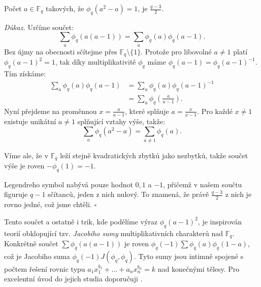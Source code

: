 \documentclass[12pt]{report}
\begin{document}


\begin{veta}
Počet $a \in \mathbb{F}_q$ takových, že $\phi_q ( a^2-a) = 1$, je $\frac{q-3}{2}$.
\end{veta}
\noindent \textit{Důkaz.} Určíme součet:
$$\sum_{a} \phi_q (a (a-1)) = \sum_{a} \phi_q (a) \phi_q (a-1).$$
Bez újmy na obecnosti sčítejme přes $\mathbb{F}_q \setminus \lbrace 1 \rbrace$. Protože pro libovolné $a \neq 1$ platí $\phi_q (a-1) ^2 = 1$, tak díky multiplikativitě $\phi_q$ máme $\phi_q (a-1) = \phi_q (a-1)^{-1}$. Tím získáme:
\begin{align*}
\sum_{a} \phi_q (a) \phi_q (a-1) &=  \sum_{a} \phi_q (a) \phi_q (a-1)^{-1}\\
&= \sum_{a} \phi_q \left (\frac{a}{a-1} \right).
\end{align*}
Nyní přejdeme na proměnnou $x = \frac{a}{a-1}$, které splňuje $a = \frac{x}{x-1}$. Pro každé $x \neq 1$ existuje unikátní $a \neq 1$ splňující vztahy výše, takže:
$$\sum_{a} \phi_q(a^2-a) = \sum_{a \neq 1} \phi_q(a).$$

Víme ale, že v $\mathbb{F}_q$ leží stejně kvadratických zbytků jako nezbytků, takže součet výše je roven $-\phi_q(1) = -1$.

Legendreho symbol nabývá pouze hodnot $0,1$ a $-1$, přičemž v našem součtu figuruje $q-1$ sčítanců, jeden z nich nulový. To znamená, že právě $\frac{q-3}{2}$ z nich je rovno jedné, což jsme chtěli. \hfill $\square$\\


\begin{poznamka}
Tento součet a ostatně i trik, kde podělíme výraz $\phi_q (a-1)^2$, je inspirován teorií obklopující tzv. \textit{Jacobiho sumy} multiplikativních charakterů nad $\mathbb{F}_q$. Konkrétně součet $\sum \phi_q (a(a-1))$ je roven $\phi_q (-1) \sum \phi_q (a) \phi_q (1-a)$, což je Jacobiho suma $\phi_q (-1) J(\phi_q, \phi_q)$. Tyto sumy jsou intimně spojené s počtem řešení rovnic typu $a_1 x_1 ^{b_1} + \dots + a_n x_n ^{b_n} = k$ nad konečnými tělesy. Pro excelentní úvod do jejich studia doporučuji \cite{Ireland}. 
\end{poznamka}
\end{document}
